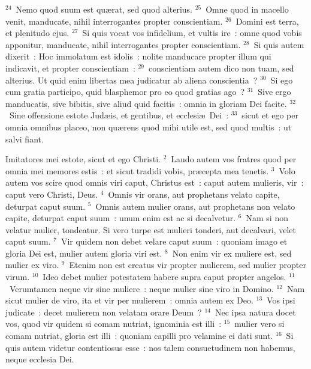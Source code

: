 ${}^{24}$~Nemo quod suum est qu\ae rat, sed quod alterius.
${}^{25}$~Omne quod in macello venit, manducate, nihil interrogantes propter conscientiam.
${}^{26}$~Domini est terra, et plenitudo ejus.
${}^{27}$~Si quis vocat vos infidelium, et vultis ire~: omne quod vobis apponitur, manducate, nihil interrogantes propter conscientiam.
${}^{28}$~Si quis autem dixerit~: Hoc immolatum est idolis~: nolite manducare propter illum qui indicavit, et propter conscientiam~:
${}^{29}$~conscientiam autem dico non tuam, sed alterius. Ut quid enim libertas mea judicatur ab aliena conscientia~?
${}^{30}$~Si ego cum gratia participo, quid blasphemor pro eo quod gratias ago~?
${}^{31}$~Sive ergo manducatis, sive bibitis, sive aliud quid facitis~: omnia in gloriam Dei facite.
${}^{32}$~Sine offensione estote Jud\ae is, et gentibus, et ecclesi\ae\ Dei~:
${}^{33}$~sicut et ego per omnia omnibus placeo, non qu\ae rens quod mihi utile est, sed quod multis~: ut salvi fiant.

\lettrine[lines=10,image=true,loversize=0.05,lraise=-0.03]{I}{}mitatores mei estote, sicut et ego Christi.
${}^{2}$~Laudo autem vos fratres quod per omnia mei memores estis~: et sicut tradidi vobis, pr\ae cepta mea tenetis.
${}^{3}$~Volo autem vos scire quod omnis viri caput, Christus est~: caput autem mulieris, vir~: caput vero Christi, Deus.
${}^{4}$~Omnis vir orans, aut prophetans velato capite, deturpat caput suum.
${}^{5}$~Omnis autem mulier orans, aut prophetans non velato capite, deturpat caput suum~: unum enim est ac si decalvetur.
${}^{6}$~Nam si non velatur mulier, tondeatur. Si vero turpe est mulieri tonderi, aut decalvari, velet caput suum.
${}^{7}$~Vir quidem non debet velare caput suum~: quoniam imago et gloria Dei est, mulier autem gloria viri est.
${}^{8}$~Non enim vir ex muliere est, sed mulier ex viro.
${}^{9}$~Etenim non est creatus vir propter mulierem, sed mulier propter virum.
${}^{10}$~Ideo debet mulier potestatem habere supra caput propter angelos.
${}^{11}$~Verumtamen neque vir sine muliere~: neque mulier sine viro in Domino.
${}^{12}$~Nam sicut mulier de viro, ita et vir per mulierem~: omnia autem ex Deo.
${}^{13}$~Vos ipsi judicate~: decet mulierem non velatam orare Deum~?
${}^{14}$~Nec ipsa natura docet vos, quod vir quidem si comam nutriat, ignominia est illi~:
${}^{15}$~mulier vero si comam nutriat, gloria est illi~: quoniam capilli pro velamine ei dati sunt.
${}^{16}$~Si quis autem videtur contentiosus esse~: nos talem consuetudinem non habemus, neque ecclesia Dei.


